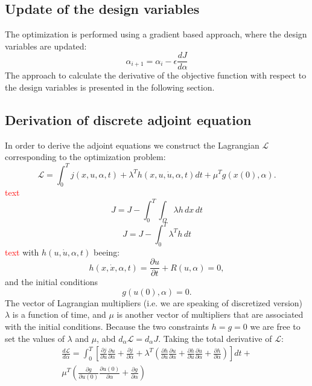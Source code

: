 \documentclass[10pt]{article}
\begin{document}
\subsection{Update of the design variables}
The optimization is performed using a gradient based approach, where the design variables are updated:
\begin{equation}
\alpha_{i+1} = \alpha_i - \epsilon \frac{d J}{d \alpha}
\end{equation}
The approach to calculate the derivative of the objective function with respect to the design variables is presented in the following section.
\subsection{Derivation of discrete adjoint equation}
In order to derive the adjoint equations we construct the Lagrangian $\mathcal{L}$ corresponding to the optimization problem:
\begin{equation}
\mathcal{L} = \int_{0}^{T} j\left(x,u,\alpha,t\right) +\lambda^T h(x,u,\dot u, \alpha,t) dt +\mu^T g(x(0),\alpha).
\end{equation}
\textcolor{red}{text}
\begin{equation}
J = J - \int_{0}^{T} \int_{\Omega} \lambda h \,dx\,dt
\end{equation}
\begin{equation}
J = J - \int_{0}^{T} \lambda^T h \,dt
\end{equation}
\textcolor{red}{text}
with $h(u,\dot u, \alpha,t)$ beeing:
\begin{equation}
h(x,\dot x, \alpha,t) = \frac{\partial u}{\partial t} + R\left(u, \alpha \right) = 0,
\end{equation}
and the initial conditions
\begin{equation}
g(u(0),\alpha) = 0.
\end{equation}
The vector of Lagrangian multipliers (i.e. we are speaking of discretized version) $\lambda$ is a function of time, and $\mu$ is another vector of multipliers that are associated with the initial conditions. Because the two constraints $h = g = 0$ we are free to set the values of $\lambda$ and $\mu$, abd $d_{\alpha}\mathcal{L} = d_{\alpha}J$. Taking the total derivative of $\mathcal{L}$:
\begin{align}
\frac{d\mathcal{L}}{d \alpha} = \int_{0}^{T}\left[\frac{\partial j}{\partial u} \frac{\partial u}{\partial \alpha} + 
\frac{\partial j}{\partial \alpha} +
\lambda^T \left( \frac{\partial h}{\partial u} \frac{\partial u}{\partial \alpha} + \frac{\partial h}{\partial\dot u} \frac{\partial\dot u}{\partial \alpha} +
\frac{\partial h}{\partial \alpha} \right)\right] dt + \\
\mu^T \left( \frac{\partial g}{\partial u(0)} \frac{\partial u(0)}{\partial\alpha}  + \frac{\partial g}{\partial\alpha} \right)
\end{align}
\end{document}
